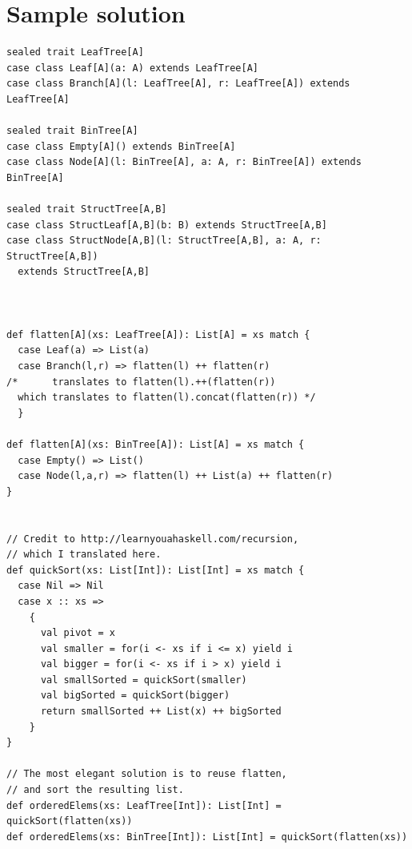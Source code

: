 \documentclass[11pt]{article}
\begin{document}
\section*{Sample solution}
\label{sec:org00af94a}
\begin{verbatim}
sealed trait LeafTree[A]
case class Leaf[A](a: A) extends LeafTree[A]
case class Branch[A](l: LeafTree[A], r: LeafTree[A]) extends LeafTree[A]

sealed trait BinTree[A]
case class Empty[A]() extends BinTree[A]
case class Node[A](l: BinTree[A], a: A, r: BinTree[A]) extends BinTree[A]

sealed trait StructTree[A,B]
case class StructLeaf[A,B](b: B) extends StructTree[A,B]
case class StructNode[A,B](l: StructTree[A,B], a: A, r: StructTree[A,B])
  extends StructTree[A,B]



def flatten[A](xs: LeafTree[A]): List[A] = xs match {
  case Leaf(a) => List(a)
  case Branch(l,r) => flatten(l) ++ flatten(r)
/*      translates to flatten(l).++(flatten(r))
  which translates to flatten(l).concat(flatten(r)) */
  }

def flatten[A](xs: BinTree[A]): List[A] = xs match {
  case Empty() => List()
  case Node(l,a,r) => flatten(l) ++ List(a) ++ flatten(r)
}


// Credit to http://learnyouahaskell.com/recursion,
// which I translated here.
def quickSort(xs: List[Int]): List[Int] = xs match {
  case Nil => Nil
  case x :: xs =>
    {
      val pivot = x
      val smaller = for(i <- xs if i <= x) yield i
      val bigger = for(i <- xs if i > x) yield i
      val smallSorted = quickSort(smaller)
      val bigSorted = quickSort(bigger)
      return smallSorted ++ List(x) ++ bigSorted
    }
}

// The most elegant solution is to reuse flatten,
// and sort the resulting list.
def orderedElems(xs: LeafTree[Int]): List[Int] = quickSort(flatten(xs))
def orderedElems(xs: BinTree[Int]): List[Int] = quickSort(flatten(xs))
\end{verbatim}
\end{document}
